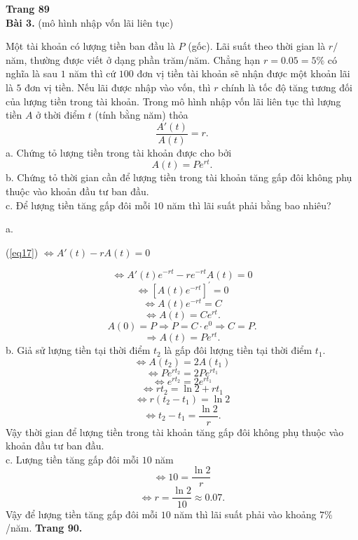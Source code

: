 \documentclass[12pt,a4paper]{article}
\begin{document}
\textbf{Trang 89}\\
\textbf{Bài 3.} (mô hình nhập vốn lãi liên tục)
\begin{mybox}
Một tài khoản có lượng tiền ban đầu là \(P\) (gốc). Lãi suất theo thời gian là \(r/\)năm, thường được viết ở dạng phần trăm/năm. Chẳng hạn \(r = 0.05 = 5\%\) có nghĩa là sau \(1\) năm thì cứ \(100\) đơn vị tiền tài khoản sẽ nhận được một khoản lãi là \(5\) đơn vị tiền. Nếu lãi được nhập vào vốn, thì \(r\) chính là tốc độ tăng tương đối của lượng tiền trong tài khoản. Trong mô hình nhập vốn lãi liên tục thì lượng tiền \(A\) ở thời điểm \(t\) (tính bằng năm) thỏa
\begin{equation}
\frac{{A'\left( t \right)}}{{A\left( t \right)}} = r.
\label{eq17}
\end{equation}
a. Chứng tỏ lượng tiền trong tài khoản được cho bởi
\[A\left( t \right) = P{e^{rt}}.\]
b. Chứng tỏ thời gian cần để lượng tiền trong tài khoản tăng gấp đôi không phụ thuộc vào khoản đầu tư ban đầu.\\
c. Để lượng tiền tăng gấp đôi mỗi \(10\) năm thì lãi suất phải bằng bao nhiêu?
\end{mybox}
a. 
\begin{center}
(\ref{eq17}) \( \Leftrightarrow A'\left( t \right) - rA\left( t \right) = 0\)
\end{center}
\[ \Leftrightarrow A'\left( t \right){e^{ - rt}} - r{e^{ - rt}}A\left( t \right) = 0\]
\[ \Leftrightarrow {\left[ {A\left( t \right){e^{ - rt}}} \right]^\prime } = 0\]
\[ \Leftrightarrow A\left( t \right){e^{ - rt}} = C\]
\[ \Leftrightarrow A\left( t \right) = C{e^{rt}}.\]
\[A\left( 0 \right) = P \Rightarrow P = C \cdot {e^0} \Rightarrow C = P.\]
\[ \Rightarrow A\left( t \right) = P{e^{rt}}.\]
b. Giả sử lượng tiền tại thời điểm \(t_2\) là gấp đôi lượng tiền tại thời điểm \(t_1.\)
\[ \Leftrightarrow A\left( {{t_2}} \right) = 2A\left( {{t_1}} \right)\]
\[ \Leftrightarrow P{e^{r{t_2}}} = 2P{e^{r{t_1}}}\]
\[ \Leftrightarrow {e^{r{t_2}}} = 2{e^{r{t_1}}}\]
\[ \Leftrightarrow r{t_2} = \ln 2 + r{t_1}\]
\[ \Leftrightarrow r\left( {{t_2} - {t_1}} \right) = \ln 2\]
\[ \Leftrightarrow {t_2} - {t_1} = \frac{{\ln 2}}{r}.\]
Vậy thời gian để lượng tiền trong tài khoản tăng gấp đôi không phụ thuộc vào khoản đầu tư ban đầu.\\
c. Lượng tiền tăng gấp đôi mỗi \(10\) năm
\[ \Leftrightarrow 10 = \frac{{\ln 2}}{r}\]
\[ \Leftrightarrow r = \frac{{\ln 2}}{{10}} \approx 0.07.\]
Vậy để lượng tiền tăng gấp đôi mỗi \(10\) năm thì lãi suất phải vào khoảng \(7 \%\)/năm.
\textbf{Trang 90.}\\
\end{document}
